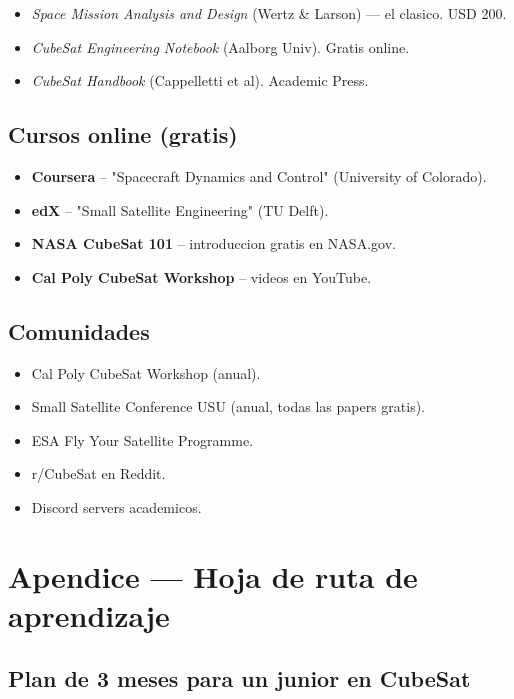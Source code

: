 \documentclass[11pt,a4paper,oneside,openright]{book}
\begin{document}
\begin{itemize}[leftmargin=2em]
  \item \emph{Space Mission Analysis and Design} (Wertz \& Larson) ---
        el clasico. USD 200.
  \item \emph{CubeSat Engineering Notebook} (Aalborg Univ). Gratis online.
  \item \emph{CubeSat Handbook} (Cappelletti et al). Academic Press.
\end{itemize}

\section{Cursos online (gratis)}

\begin{itemize}[leftmargin=2em]
  \item \textbf{Coursera} -- "Spacecraft Dynamics and Control"
        (University of Colorado).
  \item \textbf{edX} -- "Small Satellite Engineering" (TU Delft).
  \item \textbf{NASA CubeSat 101} -- introduccion gratis en NASA.gov.
  \item \textbf{Cal Poly CubeSat Workshop} -- videos en YouTube.
\end{itemize}

\section{Comunidades}

\begin{itemize}[leftmargin=2em]
  \item Cal Poly CubeSat Workshop (anual).
  \item Small Satellite Conference USU (anual, todas las papers gratis).
  \item ESA Fly Your Satellite Programme.
  \item r/CubeSat en Reddit.
  \item Discord servers academicos.
\end{itemize}

\chapter{Apendice --- Hoja de ruta de aprendizaje}

\section{Plan de 3 meses para un junior en CubeSat}
\end{document}
